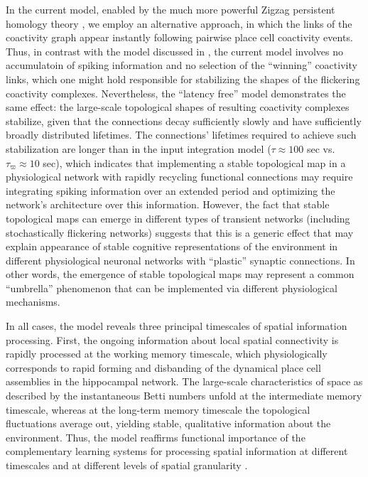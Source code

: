 \documentclass[12pt,tightenlines]{revtex4}
\begin{document}
In the current model, enabled by the much more powerful Zigzag persistent homology theory \cite{Carlsson1,Carlsson2,Edelsbrunner}, 
we employ an alternative approach, in which the links of the coactivity graph appear instantly following pairwise place 
cell coactivity events. Thus, in contrast with the model discussed in \cite{MB}, the current model involves no accumulatoin 
of spiking information and no selection of the ``winning'' coactivity links, which one might hold responsible for stabilizing
the shapes of the flickering coactivity complexes. Nevertheless, the ``latency free'' model demonstrates the same effect: 
the large-scale topological shapes of resulting coactivity complexes stabilize, given that the connections decay sufficiently 
slowly and have sufficiently broadly distributed lifetimes. The connections' lifetimes required to achieve such stabilization 
are longer than in the input integration model ($\tau \approx 100$ sec vs. $\tau_{\varpi} \approx 10$ sec), which indicates 
that implementing a stable topological map in a physiological network with rapidly recycling functional connections may require 
integrating spiking information over an extended period and optimizing the network's architecture over this information. 
However, the fact that stable topological maps can emerge in different types of transient networks (including stochastically 
flickering networks) suggests that this is a generic effect that may explain appearance of stable cognitive representations 
of the environment in different physiological neuronal networks with ``plastic'' synaptic connections. In other words, the 
emergence of stable topological maps may represent a common ``umbrella'' phenomenon that can be implemented via 
different physiological mechanisms. 

In all cases, the model reveals three principal timescales of spatial information processing. First, the ongoing information 
about local spatial connectivity is rapidly processed at the working memory timescale, which physiologically corresponds 
to rapid forming and disbanding of the dynamical place cell assemblies in the hippocampal network. The large-scale 
characteristics of space as described by the instantaneous Betti numbers unfold at the intermediate memory timescale, 
whereas at the long-term memory timescale the topological fluctuations average out, yielding stable, qualitative 
information about the environment. Thus, the model reaffirms functional importance of the complementary learning systems 
for processing spatial information at different timescales and at different levels of spatial granularity \cite{OReilly,McClelland,Fusi}.
\end{document}
